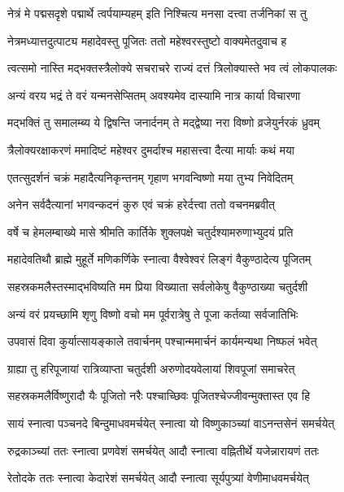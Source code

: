 \twolineshloka
{नेत्रं मे पद्मसदृशे पद्मार्थे त्वर्पयाम्यहम्}
{इति निश्चित्य मनसा दत्त्वा तर्जनिकां स तु} %

\twolineshloka
{नेत्रमध्यात्तदुत्पाट्य महादेवस्तु पूजितः}
{ततो महेश्वरस्तुष्टो वाक्यमेतदुवाच ह} %


\twolineshloka
{त्वत्समो नास्ति मद्भक्तस्त्रैलोक्ये सचराचरे}
{राज्यं दत्तं त्रिलोक्यास्ते भव त्वं लोकपालकः} %

\twolineshloka
{अन्यं वरय भद्रं ते वरं यन्मनसेप्सितम्}
{अवश्यमेव दास्यामि नात्र कार्या विचारणा} %

\twolineshloka
{मद्भक्तिं तु समालम्ब्य ये द्विषन्ति जनार्दनम्}
{ते मद्द्वेष्या नरा विष्णो व्रजेयुर्नरकं ध्रुवम्} %


\twolineshloka
{त्रैलोक्यरक्षाकरणं ममादिष्टं महेश्वर}
{दुमर्दाश्च महासत्त्वा दैत्या मार्याः कथं मया} %

\twolineshloka
{एतत्सुदर्शनं चक्रं महादैत्यनिकृन्तनम्}
{गृहाण भगवन्विष्णो मया तुभ्य निवेदितम्} %

\twolineshloka
{अनेन सर्वदैत्यानां भगवन्कदनं कुरु}
{एवं चक्रं हरेर्दत्त्वा ततो वचनमब्रवीत्} %


\twolineshloka
{वर्षे च हेमलम्बाख्ये मासे श्रीमति कार्तिके}
{शुक्लपक्षे चतुर्दश्यामरुणाभ्युदयं प्रति} %

\twolineshloka
{महादेवतिथौ ब्राह्मे मुहूर्ते मणिकर्णिके}
{स्नात्वा वैश्वेश्वरं लिङ्गं वैकुण्ठादेत्य पूजितम्} %

\twolineshloka
{सहस्रकमलैस्तस्माद्भविष्यति मम प्रिया}
{विख्याता सर्वलोकेषु वैकुण्ठाख्या चतुर्दशी} %

\twolineshloka
{अन्यं वरं प्रयच्छामि शृणु विष्णो वचो मम}
{पूर्वरात्रेषु ते पूजा कर्तव्या सर्वजातिभिः} %

\twolineshloka
{उपवासं दिवा कुर्यात्सायङ्काले तवार्चनम्}
{पश्चान्ममार्चनं कार्यमन्यथा निष्फलं भवेत्} %

\twolineshloka
{ग्राह्या तु हरिपूजायां रात्रिव्याप्ता चतुर्दशी}
{अरुणोदयवेलायां शिवपूजां समाचरेत्} %

\twolineshloka
{सहस्रकमलैर्विष्णुरादौ यैः पूजितो नरैः}
{पश्चाच्छिवः पूजितश्चेज्जीवन्मुक्तास्त एव हि} %

\twolineshloka
{सायं स्नात्वा पञ्चनदे बिन्दुमाधवमर्चयेत्}
{स्नात्वा यो विष्णुकाञ्च्यां वाऽनन्तसेनं समर्चयेत्} %

\twolineshloka
{रुद्रकाञ्च्यां ततः स्नात्वा प्रणवेशं समर्चयेत्}
{आदौ स्नात्वा वह्नितीर्थे यजेन्नारायणं ततः} %

\twolineshloka
{रेतोदके ततः स्नात्वा केदारेशं समर्चयेत्}
{आदौ स्नात्वा सूर्यपुत्र्यां वेणीमाधवमर्चयेत्} %

